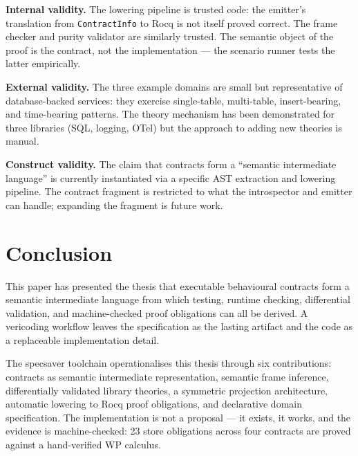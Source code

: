\documentclass[11pt,a4paper]{article}
\begin{document}

\noindent\textbf{Internal validity.}
The lowering pipeline is trusted code: the emitter's translation from
\texttt{ContractInfo} to Rocq is not itself proved correct.  The frame
checker and purity validator are similarly trusted.  The semantic
object of the proof is the contract, not the implementation --- the
scenario runner tests the latter empirically.

\noindent\textbf{External validity.}
The three example domains are small but representative of
database-backed services: they exercise single-table, multi-table,
insert-bearing, and time-bearing patterns.  The theory mechanism has
been demonstrated for three libraries (SQL, logging, OTel) but the
approach to adding new theories is manual.

\noindent\textbf{Construct validity.}
The claim that contracts form a ``semantic intermediate language'' is
currently instantiated via a specific AST extraction and lowering
pipeline.  The contract fragment is restricted to what the introspector
and emitter can handle; expanding the fragment is future work.

\section{Conclusion}\label{sec:conclusion}

This paper has presented the thesis that executable behavioural
contracts form a semantic intermediate language from which testing,
runtime checking, differential validation, and machine-checked proof
obligations can all be derived.  A vericoding workflow leaves the
specification as the lasting artifact and the code as a replaceable
implementation detail.

The \textsf{specsaver} toolchain operationalises this thesis through
six contributions: contracts as semantic intermediate representation,
semantic frame inference, differentially validated library theories, a
symmetric projection architecture, automatic lowering to Rocq proof
obligations, and declarative domain specification.  The implementation
is not a proposal --- it exists, it works, and the evidence is
machine-checked: 23 store obligations across four contracts are proved
against a hand-verified WP calculus.
\end{document}
